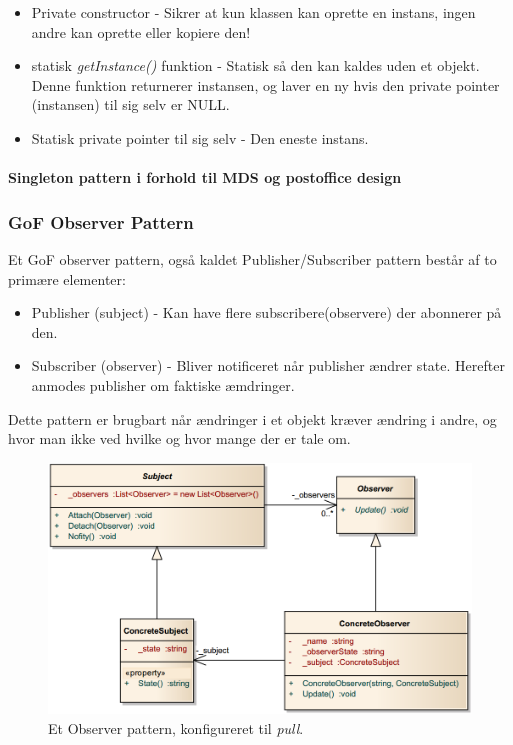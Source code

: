 \begin{itemize}
	\item Private constructor - Sikrer at kun klassen kan oprette en instans, ingen andre kan oprette eller kopiere den!
	\item statisk \textit{getInstance()} funktion - Statisk så den kan kaldes uden et objekt. Denne funktion returnerer instansen, og laver en ny hvis den private pointer (instansen) til sig selv er NULL.
	\item Statisk private pointer til sig selv - Den eneste instans.
\end{itemize}

\paragraph{Singleton pattern i forhold til MDS og postoffice design}

\subsubsection{GoF Observer Pattern}

Et GoF observer pattern, også kaldet Publisher/Subscriber pattern består af to primære elementer:

\begin{itemize}
	\item Publisher (subject) - Kan have flere subscribere(observere) der abonnerer på den.
	\item Subscriber (observer) - Bliver notificeret når publisher ændrer state. Herefter anmodes publisher om faktiske æmdringer.
\end{itemize}

Dette pattern er brugbart når ændringer i et objekt kræver ændring i andre, og hvor man ikke ved hvilke og hvor mange der er tale om.

\begin{figure}[h]
	\centering
	\includegraphics[width=0.8\linewidth]{figs/spm5/observerUML}
	\caption{Et Observer pattern, konfigureret til \textit{pull}.}
	\label{fig:ObserverPattern}
\end{figure}

